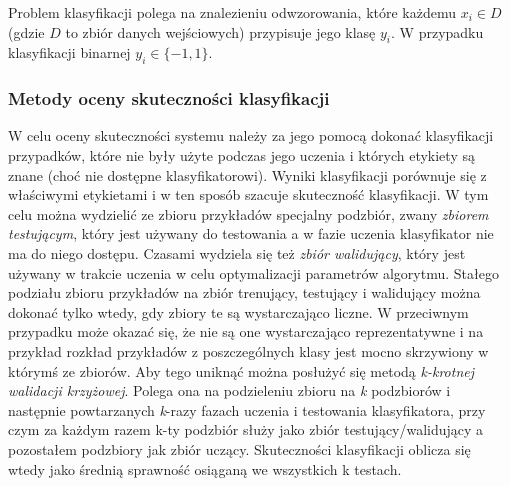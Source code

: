 Problem klasyfikacji polega na znalezieniu odwzorowania, które każdemu $ x_i \in D $ (gdzie $ D $ to zbiór danych wejściowych) przypisuje jego klasę $ y_i $. W przypadku klasyfikacji binarnej $ y_i \in \{ -1, 1 \} $.

\subsubsection{Metody oceny skuteczności klasyfikacji}

W celu oceny skuteczności systemu należy za jego pomocą dokonać klasyfikacji przypadków, które nie były użyte podczas jego uczenia i których etykiety są znane (choć nie dostępne klasyfikatorowi). Wyniki klasyfikacji porównuje się z właściwymi etykietami i w ten sposób szacuje skuteczność klasyfikacji.
W tym celu można wydzielić ze zbioru przykładów specjalny podzbiór, zwany \emph{zbiorem testującym}, który jest używany do testowania a w fazie uczenia klasyfikator nie ma do niego dostępu. Czasami wydziela się też \emph{zbiór walidujący}, który jest używany w trakcie uczenia w celu optymalizacji parametrów algorytmu.
Stałego podziału zbioru przykładów na zbiór trenujący, testujący i walidujący można dokonać tylko wtedy, gdy zbiory te są wystarczająco liczne. W przeciwnym przypadku może okazać się, że nie są one wystarczająco reprezentatywne i na przykład rozkład przykładów z poszczególnych klasy jest mocno skrzywiony w którymś ze zbiorów. Aby tego uniknąć można posłużyć się metodą \emph{k-krotnej walidacji krzyżowej}. Polega ona na podzieleniu zbioru na \emph{k} podzbiorów i następnie powtarzanych \emph{k}-razy fazach uczenia i testowania klasyfikatora, przy czym za każdym razem k-ty podzbiór służy jako zbiór testujący/walidujący a pozostałem podzbiory jak zbiór uczący. Skuteczności klasyfikacji oblicza się wtedy jako średnią sprawność osiąganą we wszystkich k testach.

